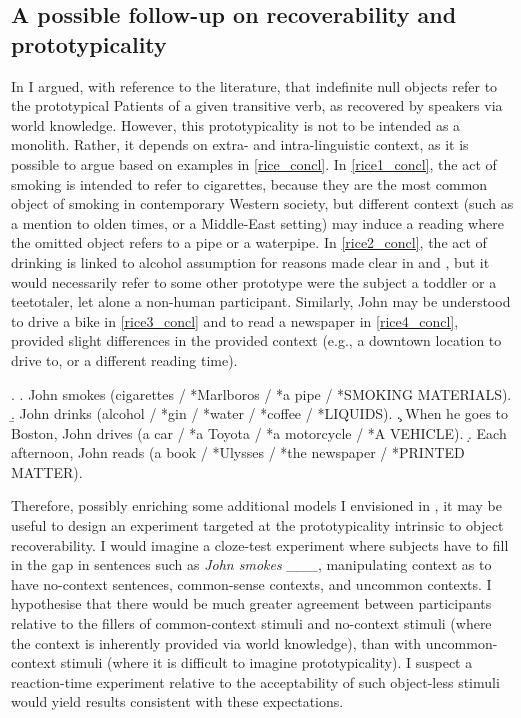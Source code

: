\subsection{A possible follow-up on recoverability and prototypicality}

In  I argued, with reference to the literature, that indefinite null objects refer to the prototypical Patients of a given transitive verb, as recovered by speakers via world knowledge. However, this prototypicality is not to be intended as a monolith. Rather, it depends on extra- and intra-linguistic context, as it is possible to argue based on  examples in \ref{rice_concl}. In \ref{rice1_concl}, the act of smoking is intended to refer to cigarettes, because they are the most common object of smoking in contemporary Western society, but different context (such as a mention to olden times, or a Middle-East setting) may induce a reading where the omitted object refers to a pipe or a waterpipe. In \ref{rice2_concl}, the act of drinking is linked to alcohol assumption for reasons made clear in  and , but it would necessarily refer to some other prototype were the subject a toddler or a teetotaler, let alone a non-human participant. Similarly, John may be understood to drive a bike in \ref{rice3_concl} and to read a newspaper in \ref{rice4_concl}, provided slight differences in the provided context (e.g., a downtown location to drive to, or a different reading time).

\ex. \label{rice_concl} \a. \label{rice1_concl} John smokes (cigarettes / *Marlboros / *a pipe / *SMOKING MATERIALS).
\b. \label{rice2_concl} John drinks (alcohol / *gin / *water / *coffee / *LIQUIDS).
\c. \label{rice3_concl} When he goes to Boston, John drives (a car / *a Toyota / *a motorcycle / *A VEHICLE).
\d. \label{rice4_concl} Each afternoon, John reads (a book / *Ulysses / *the newspaper / *PRINTED MATTER).

Therefore, possibly enriching some additional models I envisioned in , it may be useful to design an experiment targeted at the prototypicality intrinsic to object recoverability. I would imagine a cloze-test experiment where subjects have to fill in the gap in sentences such as \textit{John smokes \_\_\_}, manipulating context as to have no-context sentences, common-sense contexts, and uncommon contexts. I hypothesise that there would be much greater agreement between participants relative to the fillers of common-context stimuli and no-context stimuli (where the context is inherently provided via world knowledge), than with uncommon-context stimuli (where it is difficult to imagine prototypicality). I suspect a reaction-time experiment relative to the acceptability of such object-less stimuli would yield results consistent with these expectations.